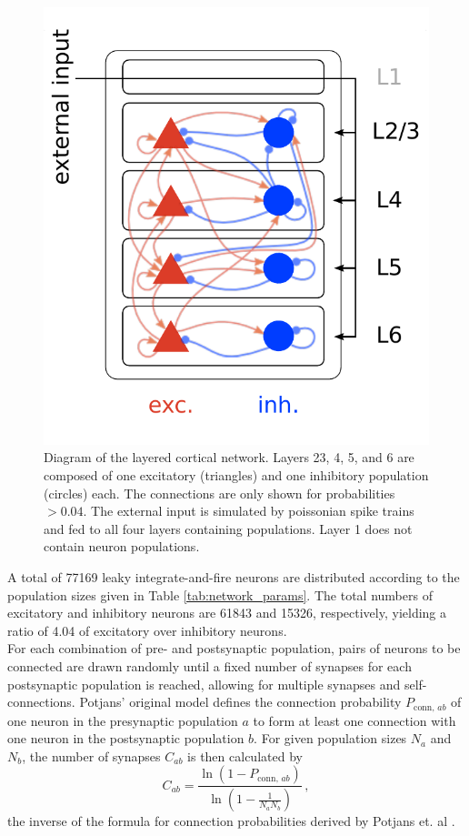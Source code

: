 \begin{figure}[htpb]
    \centering
    \includegraphics[width=0.5\linewidth]{../figures/diagram}
    \caption{Diagram of the layered cortical network. 
        Layers 23, 4, 5, and 6 are composed of one excitatory
        (triangles) and one inhibitory population (circles) each.
        The connections are only shown for probabilities $>0.04$. 
        The external input is simulated by poissonian spike trains 
        and fed to all four layers containing populations. 
        Layer 1 does not contain neuron populations.
    }
    \label{fig:diagram}
\end{figure}

A total of 77169 leaky integrate-and-fire neurons are distributed according to the population
sizes given in Table \ref{tab:network_params}. The total numbers of excitatory and inhibitory 
neurons are 61843 and 15326, respectively, yielding a ratio of 4.04 of excitatory over inhibitory
neurons. \\
For each combination of pre- and postsynaptic population, pairs of neurons to be connected are drawn
randomly until a fixed number of synapses for each postsynaptic population is reached, 
allowing for multiple synapses and self-connections. 
Potjans' original model defines the connection probability $P_{\text{conn}, \,ab}$ 
of one neuron in the presynaptic population $a$ to form at least one connection with one neuron in 
the postsynaptic population $b$. For given population sizes $N_a$ and $N_b$, the number of 
synapses $C_{ab}$ is then calculated by
\begin{equation}
    C_{ab} = \frac{\ln \left( 1 - P_{\text{conn}, \,ab} \right)}{\ln \left( 1 - \frac{1}{N_a N_b} \right)} \, ,
    \label{eq:synapse_numbers}
\end{equation}
the inverse of the formula for connection probabilities derived by Potjans et. al \cite{potjans2014}.

